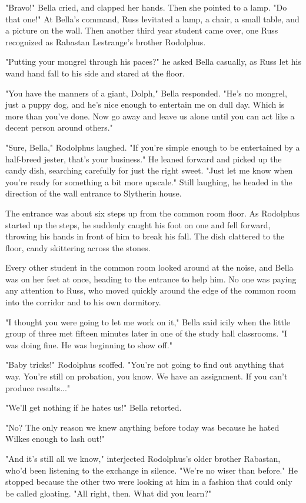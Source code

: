 \documentclass[a4paper,11pt]{article}
\begin{document}
"Bravo!" Bella cried, and clapped her hands. Then she pointed to a lamp. "Do that one!" At Bella's command, Russ levitated a lamp, a chair, a small table, and a picture on the wall. Then another third year student came over, one Russ recognized as Rabastan Lestrange's brother Rodolphus.

"Putting your mongrel through his paces?" he asked Bella casually, as Russ let his wand hand fall to his side and stared at the floor.

"You have the manners of a giant, Dolph," Bella responded. "He's no mongrel, just a puppy dog, and he's nice enough to entertain me on dull day. Which is more than you've done. Now go away and leave us alone until you can act like a decent person around others."

"Sure, Bella," Rodolphus laughed. "If you're simple enough to be entertained by a half-breed jester, that's your business." He leaned forward and picked up the candy dish, searching carefully for just the right sweet. "Just let me know when you're ready for something a bit more upscale." Still laughing, he headed in the direction of the wall entrance to Slytherin house.

The entrance was about six steps up from the common room floor. As Rodolphus started up the steps, he suddenly caught his foot on one and fell forward, throwing his hands in front of him to break his fall. The dish clattered to the floor, candy skittering across the stones.

Every other student in the common room looked around at the noise, and Bella was on her feet at once, heading to the entrance to help him. No one was paying any attention to Russ, who moved quickly around the edge of the common room into the corridor and to his own dormitory.

"I thought you were going to let me work on it," Bella said icily when the little group of three met fifteen minutes later in one of the study hall classrooms. "I was doing fine. He was beginning to show off."

"Baby tricks!" Rodolphus scoffed. "You're not going to find out anything that way. You're still on probation, you know. We have an assignment. If you can't produce results..."

"We'll get nothing if he hates us!" Bella retorted.

"No? The only reason we knew anything before today was because he hated Wilkes enough to lash out!"

"And it's still all we know," interjected Rodolphus's older brother Rabastan, who'd been listening to the exchange in silence. "We're no wiser than before." He stopped because the other two were looking at him in a fashion that could only be called gloating. "All right, then. What did you learn?"
\end{document}

